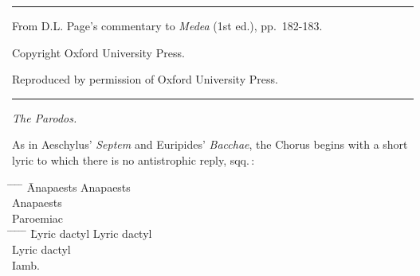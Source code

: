 \documentclass[11pt]{report}
\renewcommand{\(}{\begin{metrike}}
\renewcommand{\)}{\end{metrike}}
\begin{document}
%
\hrule height 1.5pt \vspace{1ex}
{\large From D.L. Page's commentary to \textit{Medea} (1st ed.), pp.~182-183.}\par 
\vspace{1ex}
Copyright Oxford University Press.\par
Reproduced by permission of Oxford University Press.\par 
\vspace{1ex} \hrule height 1.5pt
\vspace{5ex}
{\noindent\textit{The Parodos.}}\par
\vspace{1ex}
As in Aeschylus' \textit{Septem} and Euripides' \textit{Bacchae}, the
Chorus begins with a short lyric to which there is no antistrophic 
reply,  sqq.\,:\par
%
%
\begin{tabbing}
%
%
\hspace*{2em}\hspace{.25em}%
\=\metra{\b\b\m}\hspace{.25em}%
\=\metra{\m\m}\hspace{.25em}%
\=\metra{\b\b\m}\hspace{.25em}%
\=\metra{\b\bm}\hspace{2em}%
\=Anapaests\kill%
%
%
\>\metra{\b\b\m}%
\>\metra{\m\m}%
\>\metra{\b\b\m}%
\>\metra{\b\b\m}%
\>Anapaests\\%
%
\>\metra{\m\m}%
\>\metra{\m\m}%
\>\metra{\m\b\b}%
\>\metra{\m\b\b}%
\>Anapaests\\%
%
\>\metra{\m\b\b}%
\>\metra{\m\m}%
\>\metra{\m\m}%
\>\metra{\m}%
\>Paroemiac\\%
%
%
\hspace{.25em}%
\=\metra{\m\b\b}\hspace{.25em}%
\=\metra{\m\b\b}\hspace{.25em}%
\=\metra{\m\b\b}\hspace{.25em}%
\=\metra{\m\b\b}\hspace{.25em}%
\=\metra{\m\b\m}\hspace{2em}%
\=Lyric dactyl\kill%
%
\>\metra{\m\b\b}%
\>\metra{\m\b\b}%
\>\metra{\m\b\b}%
\>\metra{\m\b\b}%
\>\metra{\m\b\m}%
\>Lyric dactyl\\%
%
\>\metra{\m\b\b}%
\>\metra{\m\b\b}%
\>\metra{\m\b\b}%
\>\metra{\m\b\b}%
\>\metra{\m\b\m}%
\>Lyric dactyl\\%
%
\>%
\>\metra{\m\b\b}%
\>\metra{\b\m\c\m\b\m\c\b\m\m}%
\>%
\>%
\>Iamb.\\%
\end{tabbing}
\end{document}
